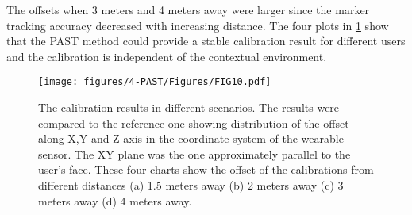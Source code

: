 {The offsets when 3 meters and 4 meters away were larger since the marker tracking accuracy decreased with increasing distance.} The four plots in \figurename{ \ref{fig:PAST}} show that the PAST method could provide a stable calibration result for different users and the calibration is independent of the contextual environment. 
\begin{figure}
	\centering
	\texttt{[image: figures/4-PAST/Figures/FIG10.pdf]}
	\caption{The calibration results in different scenarios. The results were compared to the reference one showing distribution of the offset along X,Y and Z-axis in the coordinate system of the wearable sensor. The XY plane was the one approximately parallel to the user's face. These four charts show the offset of the calibrations from different distances (a) 1.5 meters away (b) 2 meters away (c) 3 meters away (d) 4 meters away.}
	\label{fig:PAST}
\end{figure}

